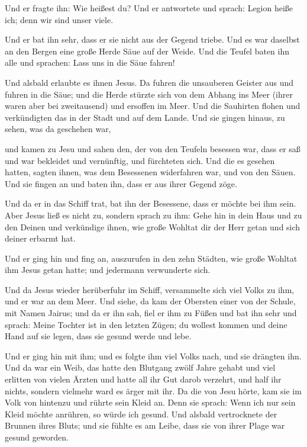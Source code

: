  Und er fragte ihn: Wie heißest du? Und er antwortete und
sprach: Legion heiße ich; denn wir sind unser viele.

 Und er bat ihn sehr, dass er sie nicht aus der Gegend
triebe.  Und es war daselbst an den Bergen eine große Herde
Säue auf der Weide.  Und die Teufel baten ihn alle und
sprachen: Lass uns in die Säue fahren!

 Und alsbald erlaubte es ihnen Jesus. Da fuhren die
unsauberen Geister aus und fuhren in die Säue; und die Herde stürzte
sich von dem Abhang ins Meer (ihrer waren aber bei zweitausend) und
ersoffen im Meer.  Und die Sauhirten flohen und
verkündigten das in der Stadt und auf dem Lande. Und sie gingen hinaus,
zu sehen, was da geschehen war,

 und kamen zu Jesu und sahen den, der von den Teufeln
besessen war, dass er saß und war bekleidet und vernünftig, und
fürchteten sich.  Und die es gesehen hatten, sagten ihnen,
was dem Besessenen widerfahren war, und von den Säuen.  Und
sie fingen an und baten ihn, dass er aus ihrer Gegend zöge.

 Und da er in das Schiff trat, bat ihn der Besessene, dass
er möchte bei ihm sein.  Aber Jesus ließ es nicht zu,
sondern sprach zu ihm: Gehe hin in dein Haus und zu den Deinen und
verkündige ihnen, wie große Wohltat dir der Herr getan und sich deiner
erbarmt hat.

 Und er ging hin und fing an, auszurufen in den zehn
Städten, wie große Wohltat ihm Jesus getan hatte; und jedermann
verwunderte sich.

 Und da Jesus wieder herüberfuhr im Schiff, versammelte
sich viel Volks zu ihm, und er war an dem Meer.  Und siehe,
da kam der Obersten einer von der Schule, mit Namen Jairus; und da er
ihn sah, fiel er ihm zu Füßen  und bat ihn sehr und sprach:
Meine Tochter ist in den letzten Zügen; du wollest kommen und deine Hand
auf sie legen, dass sie gesund werde und lebe.

 Und er ging hin mit ihm; und es folgte ihm viel Volks
nach, und sie drängten ihn.  Und da war ein Weib, das hatte
den Blutgang zwölf Jahre gehabt  und viel erlitten von
vielen Ärzten und hatte all ihr Gut darob verzehrt, und half ihr nichts,
sondern vielmehr ward es ärger mit ihr.  Da die von Jesu
hörte, kam sie im Volk von hintenzu und rührte sein Kleid an.
 Denn sie sprach: Wenn ich nur sein Kleid möchte anrühren,
so würde ich gesund.  Und alsbald vertrocknete der Brunnen
ihres Bluts; und sie fühlte es am Leibe, dass sie von ihrer Plage war
gesund geworden.

